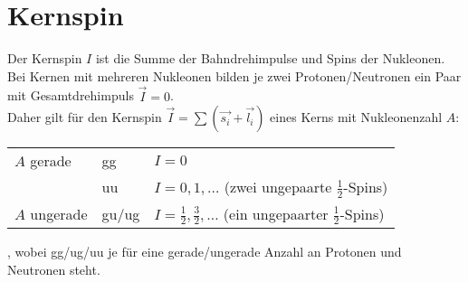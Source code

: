 \section{Kernspin}\label{sec:kernspin}
Der Kernspin $I$ ist die Summe der Bahndrehimpulse und Spins der Nukleonen.
Bei Kernen mit mehreren Nukleonen bilden je zwei Protonen/Neutronen ein Paar mit Gesamtdrehimpuls $\vec{I} = 0$.\\
Daher gilt für den Kernspin $\vec{I} = \sum (\vec{s_i} + \vec{l_i})$ eines Kerns mit Nukleonenzahl $A$:
\begin{center}
\bgroup
\def\arraystretch{1.25}
\begin{tabular}{lll}
	$A$ gerade&	gg&	$I = 0$\\
	&	uu&	$I = 0,1,\dots$ (zwei ungepaarte $\tfrac{1}{2}$-Spins)\\
	$A$ ungerade&	gu/ug&	$I = \tfrac{1}{2},\tfrac{3}{2},\dots$ (ein ungepaarter $\tfrac{1}{2}$-Spins)\\
\end{tabular}
\egroup
\end{center}
, wobei gg/ug/uu je für eine gerade/ungerade Anzahl an Protonen und Neutronen steht.

